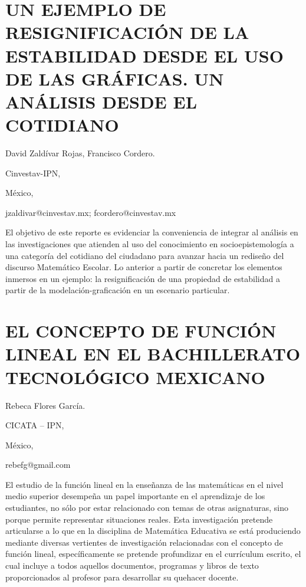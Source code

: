 \section{UN EJEMPLO DE RESIGNIFICACIÓN DE LA ESTABILIDAD DESDE EL USO DE LAS
GRÁFICAS. UN ANÁLISIS DESDE EL COTIDIANO}

\begin{datos}

David Zaldívar Rojas, Francisco Cordero.

Cinvestav-IPN,

México,

jzaldivar@cinvestav.mx; fcordero@cinvestav.mx 

\end{datos}

El objetivo de este reporte es evidenciar la conveniencia de integrar
al análisis en las investigaciones que atienden al uso del conocimiento
en socioepistemología a una categoría del cotidiano del ciudadano
para avanzar hacia un rediseño del discurso Matemático Escolar. Lo
anterior a partir de concretar los elementos inmersos en un ejemplo:
la resignificación de una propiedad de estabilidad a partir de la
modelación-graficación en un escenario particular. 


\section{EL CONCEPTO DE FUNCIÓN LINEAL EN EL BACHILLERATO TECNOLÓGICO MEXICANO}

\begin{datos}

Rebeca Flores García.

CICATA – IPN,

México,

rebefg@gmail.com

\end{datos}

El estudio de la función lineal en la enseñanza de las matemáticas
en el nivel medio superior desempeña un papel importante en el aprendizaje
de los estudiantes, no sólo por estar relacionado con temas de otras
asignaturas, sino porque permite representar situaciones reales. Esta
investigación pretende articularse a lo que en la disciplina de Matemática
Educativa se está produciendo mediante diversas vertientes de investigación
relacionadas con el concepto de función lineal, específicamente se
pretende profundizar en el currículum escrito, el cual incluye a todos
aquellos documentos, programas y libros de texto proporcionados al
profesor para desarrollar su quehacer docente. 



